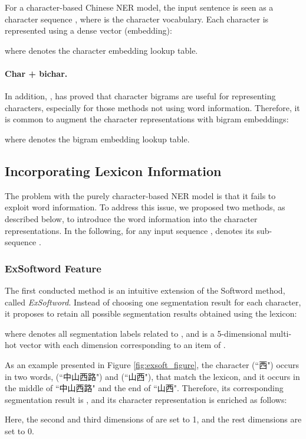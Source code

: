 \documentclass[11pt,a4paper]{article}
\begin{document}
\begin{CJK}{UTF8}{gbsn}
For a character-based Chinese NER model, the input sentence is seen as a character sequence , where  is the character vocabulary. Each character  is represented using a dense vector (embedding):

where  denotes the character embedding lookup table. 

\paragraph{Char + bichar.} In addition, \citeauthor{zhang2018chinese},  has proved that character bigrams are useful for representing characters, especially for those methods {not} using word information. Therefore, it is common to augment the character representations with bigram embeddings:

where  denotes the bigram embedding lookup table. 

\subsection{Incorporating Lexicon Information} 
The problem with the purely character-based NER model is that it fails to exploit word information. To address this issue, we proposed two methods, as described below, to introduce the word information into the character representations. In the following, for any input sequence ,  denotes its sub-sequence .


\subsubsection{ExSoftword Feature}

The first conducted method is an intuitive extension of the Softword method, called \textit{ExSoftword}. Instead of choosing one segmentation result for each character, it proposes to retain all possible segmentation results obtained using the lexicon: 

where  denotes all segmentation labels related to , and  is a 5-dimensional multi-hot vector with each dimension corresponding to an item of . 

As an example presented in Figure \ref{fig:exsoft_figure}, the character  (``西") occurs in two words,  (``中山西路") and  (``山西"), that match the lexicon, and it occurs in the middle of ``中山西路" and the end of ``山西". Therefore, its corresponding segmentation result is , and
its character representation is enriched as follows:

Here, the second and third dimensions of  are set to 1, and the rest dimensions are set to 0.


\end{CJK}
\end{document}
